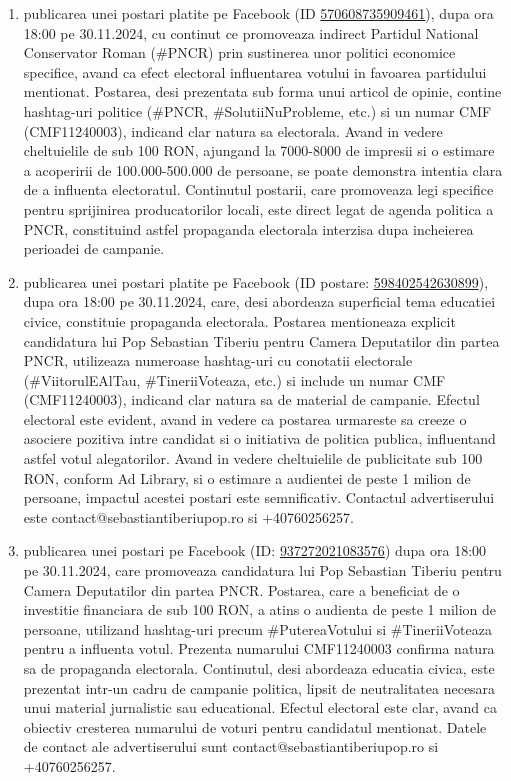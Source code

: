 \documentclass[a4paper,12pt]{article}
\begin{document}
\begin{enumerate}[leftmargin=*, label=\arabic*.)]
    \item publicarea unei postari platite pe Facebook (ID \href{https://www.facebook.com/ads/library/?id=570608735909461}{570608735909461}), dupa ora 18:00 pe 30.11.2024, cu continut ce promoveaza indirect Partidul National Conservator Roman (\#PNCR) prin sustinerea unor politici economice specifice, avand ca efect electoral influentarea votului in favoarea partidului mentionat.  Postarea, desi prezentata sub forma unui articol de opinie, contine hashtag-uri politice (\#PNCR, \#SolutiiNuProbleme, etc.) si un numar CMF (CMF11240003), indicand clar natura sa electorala.  Avand in vedere cheltuielile de sub 100 RON,  ajungand la 7000-8000 de impresii si o estimare a acoperirii de 100.000-500.000 de persoane,  se poate demonstra intentia clara de a influenta electoratul.  Continutul postarii, care promoveaza legi specifice pentru sprijinirea producatorilor locali, este direct legat de agenda politica a PNCR, constituind astfel propaganda electorala interzisa dupa incheierea perioadei de campanie.
    \item publicarea unei postari platite pe Facebook (ID postare: \href{https://www.facebook.com/ads/library/?id=598402542630899}{598402542630899}), dupa ora 18:00 pe 30.11.2024, care, desi abordeaza superficial tema educatiei civice, constituie propaganda electorala. Postarea mentioneaza explicit candidatura lui Pop Sebastian Tiberiu pentru Camera Deputatilor din partea PNCR, utilizeaza numeroase hashtag-uri cu conotatii electorale (\#ViitorulEAlTau, \#TineriiVoteaza, etc.) si include un numar CMF (CMF11240003), indicand clar natura sa de material de campanie.  Efectul electoral este evident, avand in vedere ca postarea urmareste sa creeze o asociere pozitiva intre candidat si o initiativa de politica publica, influentand astfel votul alegatorilor.  Avand in vedere cheltuielile de publicitate sub 100 RON, conform Ad Library, si o estimare a audientei de peste 1 milion de persoane, impactul acestei postari este semnificativ.  Contactul advertiserului este contact@sebastiantiberiupop.ro si +40760256257.
    \item publicarea unei postari pe Facebook (ID: \href{https://www.facebook.com/ads/library/?id=937272021083576}{937272021083576}) dupa ora 18:00 pe 30.11.2024, care promoveaza candidatura lui Pop Sebastian Tiberiu pentru Camera Deputatilor din partea PNCR. Postarea, care a beneficiat de o investitie financiara de sub 100 RON, a atins o audienta de peste 1 milion de persoane, utilizand hashtag-uri precum \#PutereaVotului si \#TineriiVoteaza pentru a influenta votul.  Prezenta numarului CMF11240003 confirma natura sa de propaganda electorala. Continutul, desi abordeaza educatia civica, este prezentat intr-un cadru de campanie politica, lipsit de neutralitatea necesara unui material jurnalistic sau educational. Efectul electoral este clar, avand ca obiectiv cresterea numarului de voturi pentru candidatul mentionat.  Datele de contact ale advertiserului sunt contact@sebastiantiberiupop.ro si +40760256257.

\end{enumerate}
\end{document}
